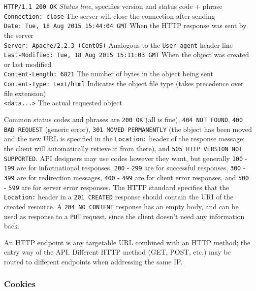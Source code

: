 \documentclass[8pt, table, xcdraw]{article}%
\begin{document}
\lstinline{HTTP/1.1 200 OK} \emph{Status line}, specifies version and status code + phrase\\
\lstinline{Connection: close} The server will close the connection after sending\\
\lstinline{Date: Tue, 18 Aug 2015 15:44:04 GMT} When the HTTP response was sent by the server\\
\lstinline{Server: Apache/2.2.3 (CentOS)} Analogous to the \lstinline{User-agent} header line\\
\lstinline{Last-Modified: Tue, 18 Aug 2015 15:11:03 GMT} When the object was created or last modified\\
\lstinline{Content-Length: 6821} The number of bytes in the object being sent\\
\lstinline{Content-Type: text/html} Indicates the object file type (takes precedence over file extension)\\
\lstinline{<data...>} The actual requested object

Common status codes and phrases are \lstinline{200 OK} (all is fine), \lstinline{404 NOT FOUND}, \lstinline{400 BAD REQUEST} (generic error), \lstinline{301 MOVED PERMANENTLY} (the object has been moved and the new URL is specified in the \lstinline{Location:} header of the response message; the client will automatically retieve it from there), and \lstinline{505 HTTP VERSION NOT SUPPORTED}. API designers may use codes however they want, but generally \lstinline{100} - \lstinline{199} are for informational responses, \lstinline{200} - \lstinline{299} are for successful responses, \lstinline{300} - \lstinline{399} are for redirection messages, \lstinline{400} - \lstinline{499} are for client error responses, and \lstinline{500} - \lstinline{599} are for server error responses. The HTTP standard specifies that the \lstinline{Location:} header in a \lstinline{201 CREATED} response should contain the URI of the created resource. A \lstinline{204 NO CONTENT} response has an empty body, and can be used as response to a \lstinline{PUT} request, since the client doesn't need any information back.

An HTTP endpoint is any targetable URL combined with an HTTP method; the entry way of the API. Different HTTP method (GET, POST, etc.) may be routed to different endpoints when addressing the same IP.

\subsubsection{Cookies}
\end{document}
